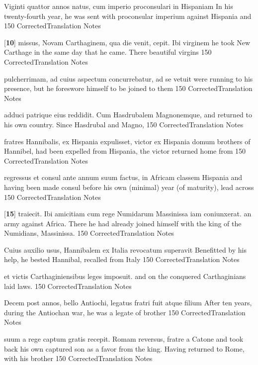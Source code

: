 \latline
  {Viginti quattor annos natus, cum imperio proconsulari in Hispaniam}
  { In his twenty-fourth year, he was sent with proconsular imperium against Hispania and }
  {150}
  { CorrectedTranslation }
  { Notes }


\latline
  {[\textbf{10}] missus, Novam Carthaginem, qua die venit, cepit.  Ibi virginem}
  { he took New Carthage in the same day that he came.  There  beautiful virgins }
  {150}
  { CorrectedTranslation }
  { Notes }


\latline
  {pulcherrimam, ad cuius aspectum concurrebatur, ad se vetuit}
  { were running to his presence, but he foreswore himself to be joined to them }
  {150}
  { CorrectedTranslation }
  { Notes }


\latline
  {adduci patrique eius reddidit.  Cum Hasdrubalem Magnonemque,}
  { and returned to his own country.  Since Hasdrubal and Magno,}
  {150}
  { CorrectedTranslation }
  { Notes }


\latline
  {fratres Hannibalis, ex Hispania expulisset, victor ex Hispania domum}
  { brothers of Hannibel, had been expelled from Hispania, the victor returned home from  }
  {150}
  { CorrectedTranslation }
  { Notes }


\latline
  {regressus et consul ante annum suum factus, in Africam classem}
  { Hispania and having been made consul before his own (minimal) year (of maturity), lead across  }
  {150}
  { CorrectedTranslation }
  { Notes }


\latline
  {[\textbf{15}] traiecit.  Ibi amicitiam cum rege Numidarum Massinissa iam coniunxerat.}
  { an army against Africa.  There he had already joined himself with the king of the Numidians, Massinissa. }
  {150}
  { CorrectedTranslation }
  { Notes }


\latline
  {Cuius auxilio usus, Hannibalem ex Italia revocatum superavit}
  { Benefitted by his help, he bested Hannibal, recalled from Italy }
  {150}
  { CorrectedTranslation }
  { Notes }


\latline
  {et victis Carthaginiensibus leges imposuit.}
  { and on the conquered Carthaginians laid laws. }
  {150}
  { CorrectedTranslation }
  { Notes }


\latline
  {Decem post annos, bello Antiochi, legatus fratri fuit atque filium}
  { After ten years, during the Antiochan war, he was a legate of brother  }
  {150}
  { CorrectedTranslation }
  { Notes }


\latline
  {suum a rege captum gratis recepit.  Romam reversus, fratre a Catone}
  { and took back his own captured son as a favor from the king.  Having returned to Rome, with his brother }
  {150}
  { CorrectedTranslation }
  { Notes }


